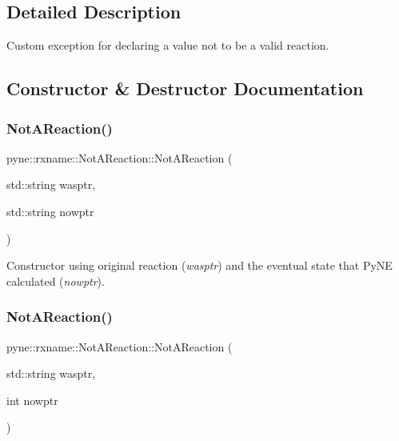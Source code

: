 \subsection{Detailed Description}
Custom exception for declaring a value not to be a valid reaction. 

\subsection{Constructor \& Destructor Documentation}
\mbox{\label{classpyne_1_1rxname_1_1_not_a_reaction_a64f23630722811847d030ae0358f959f}} 
\subsubsection{\texorpdfstring{Not\+A\+Reaction()}{NotAReaction()}\hspace{0.1cm}{\footnotesize\ttfamily [1/7]}}
{\footnotesize\ttfamily pyne\+::rxname\+::\+Not\+A\+Reaction\+::\+Not\+A\+Reaction (\begin{DoxyParamCaption}\item[{std\+::string}]{wasptr,  }\item[{std\+::string}]{nowptr }\end{DoxyParamCaption})\hspace{0.3cm}{\ttfamily [inline]}}

Constructor using original reaction ({\itshape wasptr}) and the eventual state that Py\+NE calculated ({\itshape nowptr}). \mbox{\label{classpyne_1_1rxname_1_1_not_a_reaction_a32de94daecf33a00055c8ac7ada718d7}} 
\subsubsection{\texorpdfstring{Not\+A\+Reaction()}{NotAReaction()}\hspace{0.1cm}{\footnotesize\ttfamily [2/7]}}
{\footnotesize\ttfamily pyne\+::rxname\+::\+Not\+A\+Reaction\+::\+Not\+A\+Reaction (\begin{DoxyParamCaption}\item[{std\+::string}]{wasptr,  }\item[{int}]{nowptr }\end{DoxyParamCaption})\hspace{0.3cm}{\ttfamily [inline]}}

